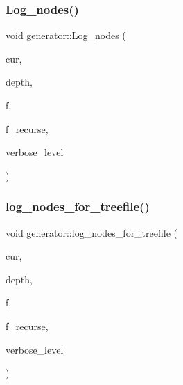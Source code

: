 \mbox{\label{classgenerator_ae9af20d24cee32bf11fe6cb9f9d8cfdf}} 
\subsubsection{\texorpdfstring{Log\+\_\+nodes()}{Log\_nodes()}}
{\footnotesize\ttfamily void generator\+::\+Log\+\_\+nodes (\begin{DoxyParamCaption}\item[{\mbox{\hyperlink{galois_8h_a09fddde158a3a20bd2dcadb609de11dc}{I\+NT}}}]{cur,  }\item[{\mbox{\hyperlink{galois_8h_a09fddde158a3a20bd2dcadb609de11dc}{I\+NT}}}]{depth,  }\item[{ostream \&}]{f,  }\item[{\mbox{\hyperlink{galois_8h_a09fddde158a3a20bd2dcadb609de11dc}{I\+NT}}}]{f\+\_\+recurse,  }\item[{\mbox{\hyperlink{galois_8h_a09fddde158a3a20bd2dcadb609de11dc}{I\+NT}}}]{verbose\+\_\+level }\end{DoxyParamCaption})}

\mbox{\label{classgenerator_af759fd46cd675616d4816dddf6cdcab6}} 
\subsubsection{\texorpdfstring{log\+\_\+nodes\+\_\+for\+\_\+treefile()}{log\_nodes\_for\_treefile()}}
{\footnotesize\ttfamily void generator\+::log\+\_\+nodes\+\_\+for\+\_\+treefile (\begin{DoxyParamCaption}\item[{\mbox{\hyperlink{galois_8h_a09fddde158a3a20bd2dcadb609de11dc}{I\+NT}}}]{cur,  }\item[{\mbox{\hyperlink{galois_8h_a09fddde158a3a20bd2dcadb609de11dc}{I\+NT}}}]{depth,  }\item[{ostream \&}]{f,  }\item[{\mbox{\hyperlink{galois_8h_a09fddde158a3a20bd2dcadb609de11dc}{I\+NT}}}]{f\+\_\+recurse,  }\item[{\mbox{\hyperlink{galois_8h_a09fddde158a3a20bd2dcadb609de11dc}{I\+NT}}}]{verbose\+\_\+level }\end{DoxyParamCaption})}

